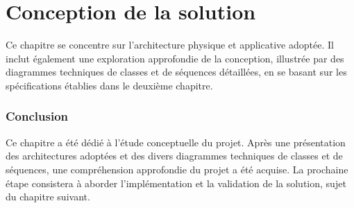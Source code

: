 \chapter{Conception de la solution}
\label{Conception de la solution}
Ce chapitre se concentre sur l'architecture physique et applicative adoptée. Il inclut également une exploration approfondie de la conception, illustrée par des diagrammes techniques de classes et de séquences détaillées, en se basant sur les spécifications établies dans le deuxième chapitre.
\newpage

\subsection*{Conclusion}

Ce chapitre a été dédié à l’étude conceptuelle du projet. Après une présentation des architectures adoptées et des divers diagrammes techniques de classes et de séquences, une compréhension approfondie du projet a été acquise. La prochaine étape consistera à aborder l’implémentation et la validation de la solution, sujet du chapitre suivant.